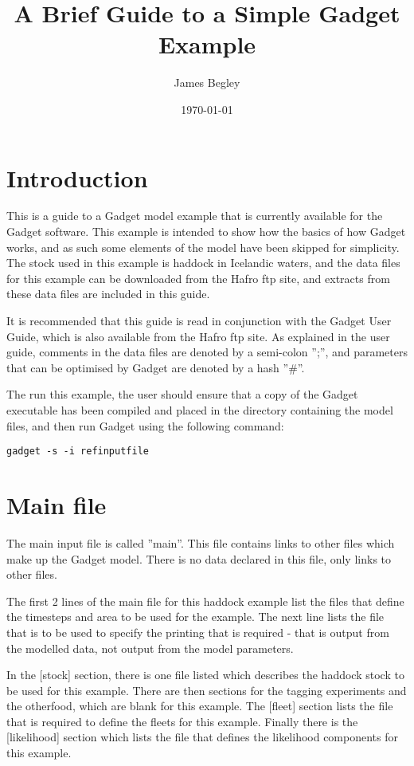 \documentclass[10pt,titlepage]{article}
\begin{document}
\title{\Huge{A Brief Guide to a Simple Gadget Example}}
\author{James Begley}
\date{\today}
\maketitle

\section{Introduction}
This is a guide to a Gadget model example that is currently available for the Gadget software.  This example is intended to show how the basics of how Gadget works, and as such some elements of the model have been skipped for simplicity.  The stock used in this example is haddock in Icelandic waters, and the data files for this example can be downloaded from the Hafro ftp site, and extracts from these data files are included in this guide.

\bigskip
It is recommended that this guide is read in conjunction with the Gadget User Guide, which is also available from the Hafro ftp site.  As explained in the user guide, comments in the data files are denoted by a semi-colon '';'', and parameters that can be optimised by Gadget are denoted by a hash ''\#''.

\bigskip
The run this example, the user should ensure that a copy of the Gadget executable has been compiled and placed in the directory containing the model files, and then run Gadget using the following command:

{\small\begin{verbatim}
gadget -s -i refinputfile
\end{verbatim}}

\section{Main file}
The main input file is called ''main''.  This file contains links to other files which make up the Gadget model.  There is no data declared in this file, only links to other files.

{\small }
The first 2 lines of the main file for this haddock example list the files that define the timesteps and area to be used for the example.  The next line lists the file that is to be used to specify the printing that is required - that is output from the modelled data, not output from the model parameters.

\bigskip
In the [stock] section, there is one file listed which describes the haddock stock to be used for this example.  There are then sections for the tagging experiments and the otherfood, which are blank for this example.  The [fleet] section lists the file that is required to define the fleets for this example.  Finally there is the [likelihood] section which lists the file that defines the likelihood components for this example.
\end{document}

